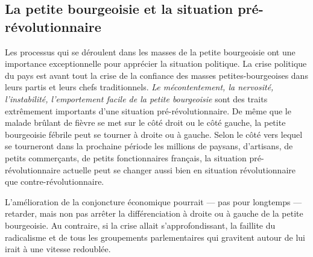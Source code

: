 \documentclass[french,twoside]{book} %
\begin{document}
 \subsection[{La petite bourgeoisie et la situation pré-révolutionnaire}]{La petite bourgeoisie et la situation pré-révolutionnaire}
\noindent Les processus qui se déroulent dans les masses de la petite bourgeoisie ont une importance exceptionnelle pour apprécier la situation politique. La crise politique du pays est avant tout la crise de la confiance des masses petites-bourgeoises dans leurs partis et leurs chefs traditionnels. \emph{Le mécontentement, la nervosité, l’instabilité, l’emportement facile de la petite bourgeoisie} sont des traits extrêmement importants d’une situation pré-révolutionnaire. De même que le malade brûlant de fièvre se met sur le côté droit ou le côté gauche, la petite bourgeoisie fébrile peut se tourner à droite ou à gauche. Selon le côté vers lequel se tourneront dans la prochaine période les millions de paysans, d’artisans, de petits commerçants, de petits fonctionnaires français, la situation pré-révolutionnaire actuelle peut se changer aussi bien en situation révolutionnaire que contre-révolutionnaire.\par
L’amélioration de la conjoncture économique pourrait — pas pour longtemps — retarder, mais non pas arrêter la différenciation à droite ou à gauche de la petite bourgeoisie. Au contraire, si la crise allait s’approfondissant, la faillite du radicalisme et de tous les groupements parlementaires qui gravitent autour de lui irait à une vitesse redoublée.
\end{document}

